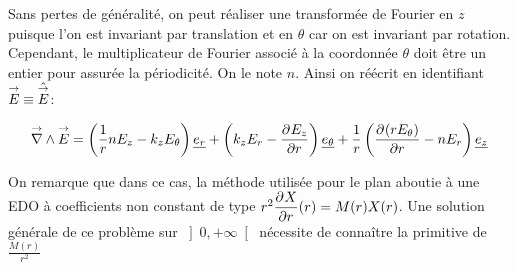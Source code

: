 Sans pertes de généralité, on peut réaliser une transformée de Fourier en $z$ puisque l'on est invariant par translation et en $\theta$ car on est invariant par rotation. Cependant, le multiplicateur de Fourier associé à la coordonnée $\theta$ doit être un entier pour assurée la périodicité. On le note $n$. Ainsi on réécrit en identifiant $\vE \equiv \hat \vE$:

\begin{equation}
\vrot \vE = \left(\frac{1}{r}nE_z - k_zE_\theta\right)\v{e_r} + 
\left(k_zE_r - \ddr{r}{E_z}\right)\v{e_\theta} +
\frac{1}{r}\left(\ddr{r}{(rE_\theta)}-nE_r\right)\v{e_z}
\end{equation}

On remarque que dans ce cas, la méthode utilisée pour le plan aboutie à une EDO à coefficients non constant de type $r^2\ddr{r}{X}(r) = M(r)X(r)$. Une solution générale de ce problème sur $\left]0,+\infty\right[$ nécessite de connaître la primitive de $\frac{M(r)}{r^2}$

